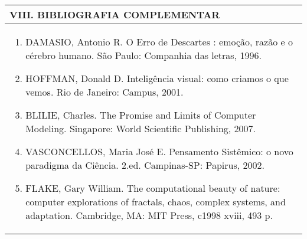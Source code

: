 \documentclass[12pt]{article}
\begin{document}
\begin{longtable}{|L{1.025\textwidth}|} \hline
%
{\bf VIII. BIBLIOGRAFIA COMPLEMENTAR} \\ \hline
\begin{enumerate}
\item DAMASIO, Antonio R. O Erro de Descartes : emoção, razão e o cérebro humano. São Paulo: Companhia das letras, 1996. 
\item HOFFMAN, Donald D. Inteligência visual: como criamos o que vemos. Rio de Janeiro: Campus, 2001. 
\item BLILIE, Charles. The Promise and Limits of Computer Modeling. Singapore: World Scientific Publishing, 2007. 
\item VASCONCELLOS, Maria José E. Pensamento Sistêmico: o novo paradigma da Ciência. 2.ed. Campinas-SP: Papirus, 2002. 
\item FLAKE, Gary William. The computational beauty of nature: computer explorations of fractals, chaos, complex systems, and adaptation. Cambridge, MA: MIT Press, c1998 xviii, 493 p.

\end{enumerate}
 \\ \hline
\end{longtable}



\end{document}
